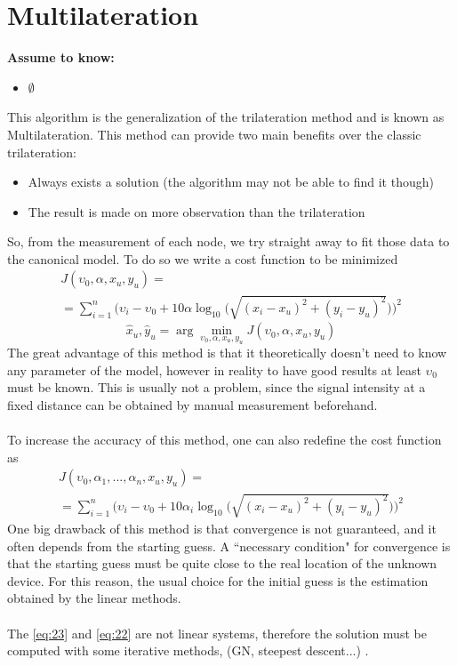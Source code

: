 \documentclass[12pt]{report}
\begin{document}
\section{Multilateration}
  \begin{center}
  \textbf{Assume to know:}
  \begin{itemize}
    \centering
    \item $\emptyset$
  \end{itemize}
  \end{center}
This algorithm is the generalization of the trilateration method and is known as Multilateration. 
This method can provide two main benefits over the classic trilateration:
\begin{itemize}
    \item Always exists a solution (the algorithm may not be able to find it though)
    \item The result is made on more observation than the trilateration
\end{itemize}
So, from the measurement of each node, we try straight away to fit those data to the canonical model. To do so we write a cost function to be minimized
\begin{multline}
    J(\upsilon_0,\alpha,x_u,y_u)=\\=\sum_{i=1}^n\bigg(\upsilon_i-\upsilon_0+10\alpha\log_{10}\big(\sqrt{(x_i-x_u)^2+(y_i-y_u)^2}\big)\bigg)^2
    \label{eq:23}
\end{multline}
\begin{equation}
\hat{x}_u, \hat{y}_u=\arg \min_{\upsilon_0,\alpha,x_u,y_u}J(\upsilon_0,\alpha,x_u,y_u)
\end{equation}
The great advantage of this method is that it theoretically doesn't need to know any parameter of the model, however in reality to have good results at least $\upsilon_0$ must be known. This is usually not a problem, since the signal intensity at a fixed distance can be obtained by manual measurement beforehand.\\\\
To increase the accuracy of this method, one can also redefine the cost function as
\begin{multline}
    J(\upsilon_0,\alpha_1,...,\alpha_n,x_u,y_u)=\\=\sum_{i=1}^n\bigg(\upsilon_i-\upsilon_0+10\alpha_i\log_{10}\big(\sqrt{(x_i-x_u)^2+(y_i-y_u)^2}\big)\bigg)^2
    \label{eq:22}
\end{multline}
One big drawback of this method is that convergence is not guaranteed, and it often depends from the starting guess. A ``necessary condition" for convergence is that the starting guess must be quite close to the real location of the unknown device. For this reason, the usual choice for the initial guess is the estimation obtained by the linear methods.\\\\ 
The \ref{eq:23} and \ref{eq:22} are not linear systems, therefore the solution must be computed with some iterative methods, (GN, steepest descent...) \cite{chong2013introduction}.
\clearpage
\end{document}
